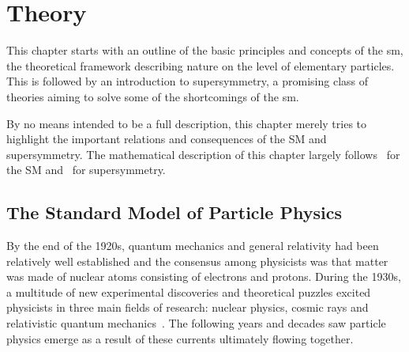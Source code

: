 
\chapter{Theory}

\ifpdf
    \graphicspath{{chapter-theory/Figs/Raster/}{chapter-theory/Figs/PDF/}{chapter-theory/Figs/}}
\else
    \graphicspath{{chapter-theory/Figs/Vector/}{chapter-theory/Figs/}}
\fi

This chapter starts with an outline of the basic principles and concepts of the \gls{sm}, the theoretical framework describing nature on the level of elementary particles. This is followed by an introduction to supersymmetry, a promising class of theories aiming to solve some of the shortcomings of the \gls{sm}.

By no means intended to be a full description, this chapter merely tries to highlight the important relations and consequences of the SM and supersymmetry. The mathematical description of this chapter largely follows~\cite{Brock:1354959, Peskin:1995ev} for the SM and~\cite{Martin:1997ns,Bustamante:2009us} for supersymmetry.

\section{The Standard Model of Particle Physics}


By the end of the 1920s, quantum mechanics and general relativity had been relatively well established and the consensus among physicists was that matter was made of nuclear atoms consisting of electrons and protons. During the 1930s, a multitude of new experimental discoveries and theoretical puzzles excited physicists in three main fields of research: nuclear physics, cosmic rays and relativistic quantum mechanics~\cite{brown1986the}. The following years and decades saw particle physics emerge as a result of these currents ultimately flowing together.

